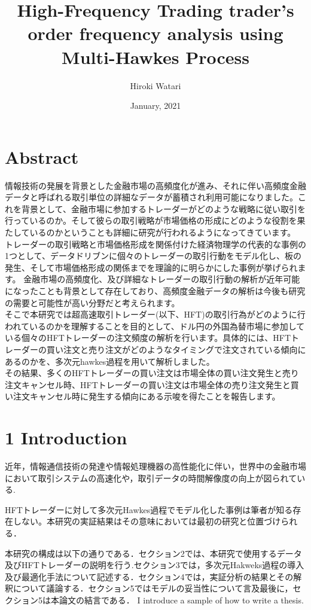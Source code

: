 \documentclass[a4paper,11pt,oneside,openany]{book}
\title{High-Frequency Trading trader's order frequency analysis using Multi-Hawkes Process}
\author{Hiroki Watari}
\affiliation{%
  Graduate Major in Artificial Intelligence\\
  School of Computing\\
  Tokyo Institute of Technology}
\date{January, 2021}
\begin{document}
\frontmatter
\maketitle
\chapter{Abstract}
情報技術の発展を背景とした金融市場の高頻度化が進み、それに伴い高頻度金融データと呼ばれる取引単位の詳細なデータが蓄積され利用可能になりました。これを背景として、金融市場に参加するトレーダーがどのような戦略に従い取引を行っているのか。そして彼らの取引戦略が市場価格の形成にどのような役割を果たしているのかということも詳細に研究が行われるようになってきています。\\
トレーダーの取引戦略と市場価格形成を関係付けた経済物理学の代表的な事例の1つとして、データドリブンに個々のトレーダーの取引行動をモデル化し、板の発生、そして市場価格形成の関係までを理論的に明らかにした事例が挙げられます。 金融市場の高頻度化、及び詳細なトレーダーの取引行動の解析が近年可能になったことも背景として存在しており、高頻度金融データの解析は今後も研究の需要と可能性が高い分野だと考えられます。\\
そこで本研究では超高速取引トレーダー(以下、HFT)の取引行為がどのように行われているのかを理解することを目的として、ドル円の外国為替市場に参加している個々のHFTトレーダーの注文頻度の解析を行います。具体的には、HFTトレーダーの買い注文と売り注文がどのようなタイミングで注文されている傾向にあるのかを、多次元hawkes過程を用いて解析しました。\\
その結果、多くのHFTトレーダーの買い注文は市場全体の買い注文発生と売り注文キャンセル時、HFTトレーダーの買い注文は市場全体の売り注文発生と買い注文キャンセル時に発生する傾向にある示唆を得たことを報告します。

\tableofcontents

\chapter{1 Introduction}
近年，情報通信技術の発達や情報処理機器の高性能化に伴い，世界中の金融市場において取引システムの高速化や，取引データの時間解像度の向上が図られている.

HFTトレーダーに対して多次元Hawkes過程でモデル化した事例は筆者が知る存在しない。本研究の実証結果はその意味においては最初の研究と位置づけられる．



本研究の構成は以下の通りである．セクション2では、本研究で使用するデータ及びHFTトレーダーの説明を行う.セクション3では，多次元Hakweks過程の導入及び最適化手法について記述する．セクション4では，実証分析の結果とその解釈について議論する．セクション5ではモデルの妥当性について言及最後に，セクション5は本論文の結言である．
I introduce a sample of how to write a thesis\cite{1}.
\end{document}
